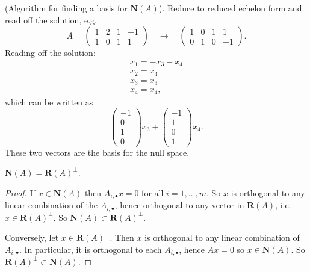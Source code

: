 \documentclass[12pt]{article}
\begin{document}
\begin{example}
	(Algorithm for finding a basis for $\mathbf{N}(A)$). Reduce to reduced echelon form and read off the solution, e.g. 
	\begin{equation*}
		A = \begin{pmatrix} 1 & 2 & 1 & -1 \\ 1 & 0 & 1 & 1 \end{pmatrix} \quad \to \quad \begin{pmatrix} 1 & 0 & 1 & 1 \\ 0 & 1 & 0 & -1 \end{pmatrix}.
	\end{equation*}
	Reading off the solution:
	\begin{gather*}
		x_1 = -x_3 - x_4 \\
		x_2 = x_4 \\
		x_3 = x_3 \\
		x_4 = x_4,
	\end{gather*}
	which can be written as 
	\begin{equation*}
		\begin{pmatrix} -1 \\ 0 \\ 1 \\ 0 \end{pmatrix}x_3 + \begin{pmatrix} -1 \\ 1 \\ 0 \\ 1 \end{pmatrix}x_4.
	\end{equation*}
	These two vectors are the basis for the null space.
\end{example}

\begin{proposition}
	$\mathbf{N}(A) = \mathbf{R}(A)^\perp$.
\end{proposition}
\begin{proof} 
	If $x\in\mathbf{N}(A)$ then $A_{i,\bullet}x = 0$ for all $i=1,\dots,m$. So $x$ is orthogonal to any linear combination of the $A_{i,\bullet}$, hence orthogonal to any vector in $\mathbf{R}(A)$, i.e. $x\in\mathbf{R}(A)^\perp$. So $\mathbf{N}(A)\subset\mathbf{R}(A)^\perp$. 

	Conversely, let $x\in\mathbf{R}(A)^\perp$. Then $x$ is orthogonal to any linear combination of $A_{i,\bullet}$. In particular, it is orthogonal to each $A_{i,\bullet}$, hence $Ax=0$ so $x\in\mathbf{N}(A)$. So $\mathbf{R}(A)^\perp\subset\mathbf{N}(A)$.
\end{proof}	
\end{document}
